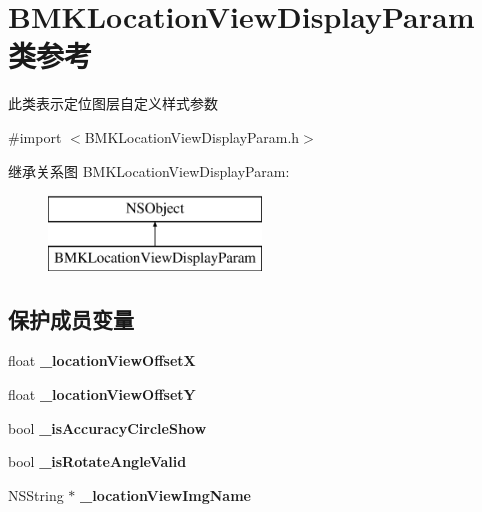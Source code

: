 \hypertarget{interface_b_m_k_location_view_display_param}{\section{B\-M\-K\-Location\-View\-Display\-Param 类参考}
\label{interface_b_m_k_location_view_display_param}
}


此类表示定位图层自定义样式参数  




{\ttfamily \#import $<$B\-M\-K\-Location\-View\-Display\-Param.\-h$>$}

继承关系图 B\-M\-K\-Location\-View\-Display\-Param\-:\begin{figure}[H]
\begin{center}
\leavevmode
\includegraphics[height=2.000000cm]{interface_b_m_k_location_view_display_param}
\end{center}
\end{figure}
\subsection*{保护成员变量}
\begin{DoxyCompactItemize}
\item 
\hypertarget{interface_b_m_k_location_view_display_param_aca7d451721e1c1e3f75766fe3a3572e1}{float {\bfseries \-\_\-location\-View\-Offset\-X}}\label{interface_b_m_k_location_view_display_param_aca7d451721e1c1e3f75766fe3a3572e1}

\item 
\hypertarget{interface_b_m_k_location_view_display_param_a7914b096cec7ba724e9eb0b752c77dc0}{float {\bfseries \-\_\-location\-View\-Offset\-Y}}\label{interface_b_m_k_location_view_display_param_a7914b096cec7ba724e9eb0b752c77dc0}

\item 
\hypertarget{interface_b_m_k_location_view_display_param_a376ad9f3e561b1ff5c1fed963ffa62b8}{bool {\bfseries \-\_\-is\-Accuracy\-Circle\-Show}}\label{interface_b_m_k_location_view_display_param_a376ad9f3e561b1ff5c1fed963ffa62b8}

\item 
\hypertarget{interface_b_m_k_location_view_display_param_a9a113a1e0217f64e06311e752263d6e0}{bool {\bfseries \-\_\-is\-Rotate\-Angle\-Valid}}\label{interface_b_m_k_location_view_display_param_a9a113a1e0217f64e06311e752263d6e0}

\item 
\hypertarget{interface_b_m_k_location_view_display_param_a8cc611777402a8a9ca0fe3b12a48d87b}{N\-S\-String $\ast$ {\bfseries \-\_\-location\-View\-Img\-Name}}\label{interface_b_m_k_location_view_display_param_a8cc611777402a8a9ca0fe3b12a48d87b}

\end{DoxyCompactItemize}
